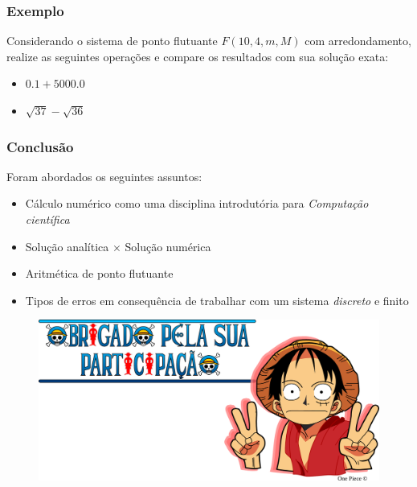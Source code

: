 \documentclass{beamer}
\begin{document}
\begin{frame}
	\frametitle{Exemplo}	
	Considerando o sistema de ponto flutuante $ F(10, 4, m, M) $ com arredondamento, realize as seguintes operações e compare os resultados com sua solução exata:
	\begin{itemize}
		\item $ 0.1 + 5000.0 $
		\item $ \sqrt{37} - \sqrt{36} $
	\end{itemize}
\end{frame}

\begin{frame}
	\frametitle{Conclusão}	
	Foram abordados os seguintes assuntos:
	\begin{itemize}
		\item Cálculo numérico como uma disciplina introdutória para \textit{Computação científica}
		\item Solução analítica $ \times $ Solução numérica
		\item Aritmética de ponto flutuante
		\item Tipos de erros em consequência de trabalhar com um sistema \textit{discreto} e finito
	\end{itemize}
\end{frame}

\begin{frame}[plain]
\bigskip
\bigskip
\bigskip
\bigskip
\bigskip
\begin{figure}
	\centering
	\includegraphics[width=0.9\linewidth]{../Luffy_v}
	\label{fig:luffyv}
\end{figure}
\end{frame}
\end{document}
